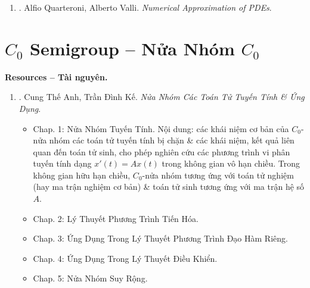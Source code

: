 \documentclass{article}
\newtheorem{theorem}{Theorem}
\begin{document}
\begin{enumerate}
\begin{itemize}
\begin{itemize}
			\begin{theorem}
				Let $\{u_i\}$ be the solution \eqref{general 1st order ODE: forward difference} \& $y(x)$ the solution of \eqref{general 1st order ODE} where $f(x,y)$ satisfies \eqref{Lipschitz condition} in the strip $S:[a\le x\le b,\ |y| < \infty]$. then, with the definitions of \eqref{local truncation error 1} of $\{\tau_i\}$:
				\begin{equation}
					|u_i - y(x_i)|\le e^{K(x_i - a)}\left(|e_0| + \frac{\tau}{K}\right),\ i = 0,1,\ldots,N,\mbox{ where } \tau\coloneqq\max_i |\tau_i|.
				\end{equation}
			\end{theorem}
			
		\end{itemize}
		\item {\sf Chap. 9: Difference Methods for PDEs.}
	\end{itemize}
	
	\item \cite{Quarteroni_Valli1994}. {\sc Alfio Quarteroni, Alberto Valli}. {\it Numerical Approximation of PDEs}.
\end{enumerate}


\section{$C_0$ Semigroup -- Nửa Nhóm $C_0$}
\textbf{\textsf{Resources -- Tài nguyên.}}
\begin{enumerate}
	\item \cite{Anh_Ke_semigroup}. {\sc Cung Thế Anh, Trần Đình Kế}. {\it Nửa Nhóm Các Toán Tử Tuyến Tính \& Ứng Dụng}.
	
	\begin{itemize}
		\item {\sf Chap. 1: Nửa Nhóm Tuyến Tính.} Nội dung: các khái niệm cơ bản của $C_0$-nửa nhóm các toán tử tuyến tính bị chặn \& các khái niệm, kết quả liên quan đến toán tử sinh, cho phép nghiên cứu các phương trình vi phân tuyến tính dạng $x'(t) = Ax(t)$ trong không gian vô hạn chiều. Trong không gian hữu hạn chiều, $C_0$-nửa nhóm tương ứng với toán tử nghiệm (hay ma trận nghiệm cơ bản) \& toán tử sinh tương ứng với ma trận hệ số $A$.		
		
		\item {\sf Chap. 2: Lý Thuyết Phương Trình Tiến Hóa.}
		\item {\sf Chap. 3: Ứng Dụng Trong Lý Thuyết Phương Trình Đạo Hàm Riêng.}
		\item {\sf Chap. 4: Ứng Dụng Trong Lý Thuyết Điều Khiển.}
		\item {\sf Chap. 5: Nửa Nhóm Suy Rộng.}
	\end{itemize}
\end{enumerate}
\end{document}
